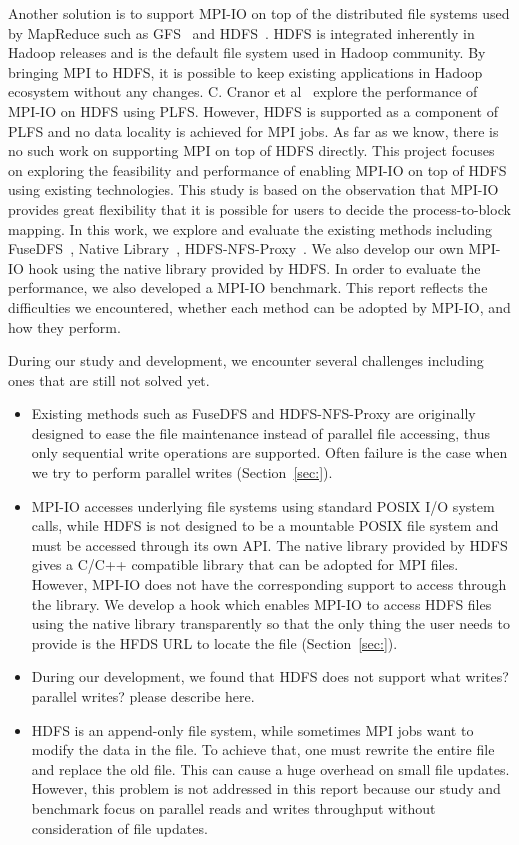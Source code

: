 Another solution is to support MPI-IO on top of the distributed file systems
used by MapReduce such as GFS~\cite{gfs} and HDFS~\cite{hdfs}. HDFS is integrated
inherently in Hadoop releases and is the default file system used in Hadoop
community. By bringing MPI to HDFS, it is possible to keep existing applications
in Hadoop ecosystem without any changes. C. Cranor et al~\cite{CMU-PDL-12-115} explore the
performance of MPI-IO on HDFS using PLFS. However, HDFS is supported as a
component of PLFS and no data locality is achieved for MPI jobs. As far as we
know, there is no such work on supporting MPI on top of HDFS directly. This
project focuses on exploring the feasibility and performance of enabling MPI-IO
on top of HDFS using existing technologies. This study is based on the
observation that MPI-IO provides great flexibility that it is possible for users
to decide the process-to-block mapping. In this work, we explore and evaluate
the existing methods including FuseDFS~\cite{fuse}, Native Library~\cite{lib},
HDFS-NFS-Proxy~\cite{proxy}. We also develop our own MPI-IO hook using the
native library provided by HDFS. In order to evaluate the performance, we also
developed a MPI-IO benchmark. This report reflects the difficulties we
encountered, whether each method can be adopted by MPI-IO, and how they perform. 

During our study and development, we encounter several
challenges including ones that are still not solved yet.
\begin{itemize}
\item Existing methods such as FuseDFS and HDFS-NFS-Proxy are originally designed to ease the file
	maintenance instead of parallel file accessing, thus only sequential
	write operations are supported. Often failure is the case when we try to
	perform parallel writes (Section~\ref{sec:}). 
\item MPI-IO accesses underlying file systems using standard POSIX I/O system
	calls, while HDFS is not designed to be a mountable POSIX file system
	and must be accessed through its own API. The native library provided by
	HDFS gives a C/C++ compatible library that can be adopted for MPI files.
	However, MPI-IO does not have the corresponding support to access
	through the library. We develop a hook which enables MPI-IO to access
	HDFS files using the native library transparently so that the only thing
	the user needs to provide is the HFDS URL to locate the file
	(Section~\ref{sec:}).
\item During our development, we found that HDFS does not support 
{\color{red} what writes? parallel writes? please describe here. }
\item HDFS is an append-only file system, while sometimes MPI jobs want to
	modify the data in the file. To achieve that, one must rewrite the
	entire file and replace the old file. This can cause a huge overhead on
	small file updates. However, this problem is not addressed in this
	report because our study and benchmark focus on parallel reads and
	writes throughput without consideration of file updates.
\end{itemize}

